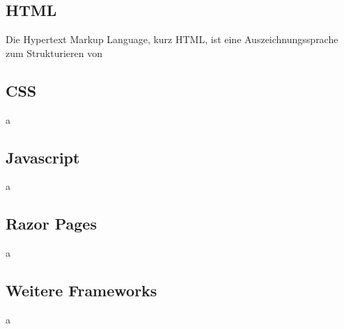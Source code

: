     \subsection{HTML}
    Die Hypertext Markup Language, kurz HTML, ist eine Auszeichnungssprache zum Strukturieren von
    

    \subsection{CSS}
    a

    \subsection{Javascript}
    a

    \subsection{Razor Pages}
    a

    \subsection{Weitere Frameworks}
    a   